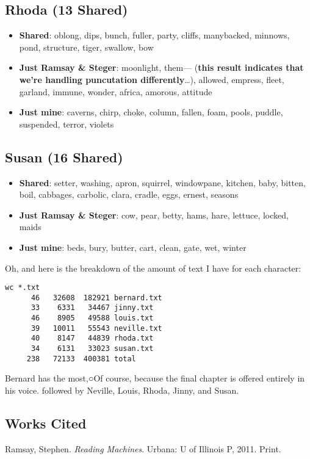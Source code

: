 \documentclass[
  12pt,
]{article}
\providecommand{\tightlist}{%
  \setlength{\itemsep}{0pt}\setlength{\parskip}{0pt}}
\begin{document}
\hypertarget{rhoda-13-shared}{%
\subsection{Rhoda (13 Shared)}\label{rhoda-13-shared}}

\begin{itemize}
\tightlist
\item
  \textbf{Shared}: oblong, dips, bunch, fuller, party, cliffs,
  manybacked, minnows, pond, structure, tiger, swallow, bow
\item
  \textbf{Just Ramsay \& Steger}: moonlight, them--- (\textbf{this
  result indicates that we're handling puncutation differently}\ldots),
  allowed, empress, fleet, garland, immune, wonder, africa, amorous,
  attitude
\item
  \textbf{Just mine}: caverns, chirp, choke, column, fallen, foam,
  pools, puddle, suspended, terror, violets
\end{itemize}

\hypertarget{susan-16-shared}{%
\subsection{Susan (16 Shared)}\label{susan-16-shared}}

\begin{itemize}
\tightlist
\item
  \textbf{Shared}: setter, washing, apron, squirrel, windowpane,
  kitchen, baby, bitten, boil, cabbages, carbolic, clara, cradle, eggs,
  ernest, seasons
\item
  \textbf{Just Ramsay \& Steger}: cow, pear, betty, hams, hare, lettuce,
  locked, maids
\item
  \textbf{Just mine}: beds, bury, butter, cart, clean, gate, wet, winter
\end{itemize}

Oh, and here is the breakdown of the amount of text I have for each
character:

\begin{verbatim}
wc *.txt
      46   32608  182921 bernard.txt
      33    6331   34467 jinny.txt
      46    8905   49588 louis.txt
      39   10011   55543 neville.txt
      40    8147   44839 rhoda.txt
      34    6131   33023 susan.txt
     238   72133  400381 total
\end{verbatim}

Bernard has the most,○{Of course, because the final chapter is offered
entirely in his voice.} followed by Neville, Louis, Rhoda, Jinny, and
Susan.

\hypertarget{works-cited}{%
\subsection{Works Cited}\label{works-cited}}

Ramsay, Stephen. \emph{Reading Machines}. Urbana: U of Illinois P, 2011.
Print.
\end{document}
